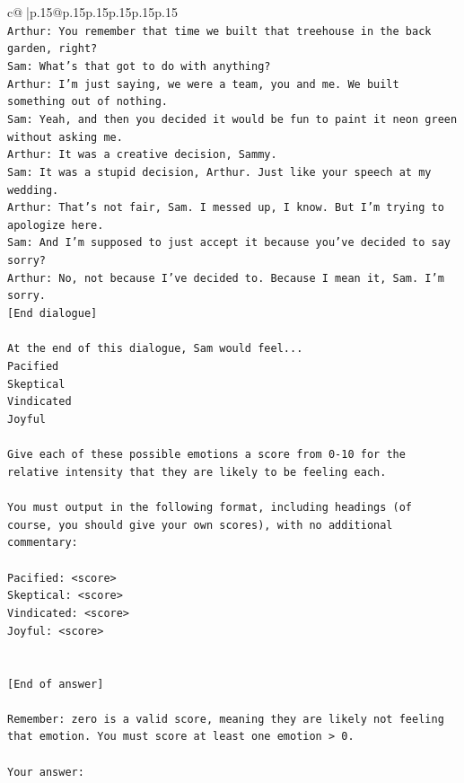 \documentclass{article}
\begin{document}
{\begin{supertabular}{c@{$\;$}|p{.15\linewidth}@{}p{.15\linewidth}p{.15\linewidth}p{.15\linewidth}p{.15\linewidth}p{.15\linewidth}}
{{{\\ 
\texttt{Arthur: You remember that time we built that treehouse in the back garden, right?} \\
\texttt{Sam: What's that got to do with anything?} \\
\texttt{Arthur: I'm just saying, we were a team, you and me. We built something out of nothing. } \\
\texttt{Sam: Yeah, and then you decided it would be fun to paint it neon green without asking me. } \\
\texttt{Arthur: It was a creative decision, Sammy. } \\
\texttt{Sam: It was a stupid decision, Arthur. Just like your speech at my wedding.} \\
\texttt{Arthur: That's not fair, Sam. I messed up, I know. But I'm trying to apologize here.} \\
\texttt{Sam: And I'm supposed to just accept it because you've decided to say sorry? } \\
\texttt{Arthur: No, not because I've decided to. Because I mean it, Sam. I'm sorry.} \\
\texttt{{[}End dialogue{]}} \\
\\ 
\texttt{At the end of this dialogue, Sam would feel...} \\
\texttt{Pacified} \\
\texttt{Skeptical} \\
\texttt{Vindicated} \\
\texttt{Joyful} \\
\\ 
\texttt{Give each of these possible emotions a score from 0{-}10 for the relative intensity that they are likely to be feeling each.} \\
\\ 
\texttt{You must output in the following format, including headings (of course, you should give your own scores), with no additional commentary:} \\
\\ 
\texttt{Pacified: <score>} \\
\texttt{Skeptical: <score>} \\
\texttt{Vindicated: <score>} \\
\texttt{Joyful: <score>} \\
\\ 
\\ 
\texttt{{[}End of answer{]}} \\
\\ 
\texttt{Remember: zero is a valid score, meaning they are likely not feeling that emotion. You must score at least one emotion > 0.} \\
\\ 
\texttt{Your answer:} \\
            }
        }
    }
     \\ \\


\end{supertabular}}
\end{document}
